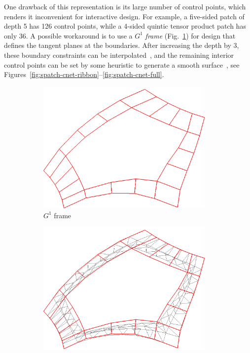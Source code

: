 \documentclass[9pt,academicons]{article}
\begin{document}
One drawback of this representation is its large number of control points, which renders it
inconvenient for interactive design. For example, a five-sided patch of depth 5 has 126 control
points, while a 4-sided quintic tensor product patch has only 36. A possible workaround is to use a
$G^1$ \emph{frame} (Fig.~\ref{fig:spatch-ribbon})
for design that defines the tangent planes at the boundaries.
After increasing the depth by 3, these boundary constraints can be interpolated~\cite{Loop:1990},
and the remaining interior control points can be set by some heuristic to generate a smooth
surface~\cite{Salvi:2019:KEPAF}, see
Figures~\ref{fig:spatch-cnet-ribbon}--\ref{fig:spatch-cnet-full}.
\begin{figure}
  {
    \begin{subfigure}{0.32\textwidth}
      \centering
      \includegraphics[width = 0.95\textwidth]{images/5-5-bezier-ribbon.png}
      \caption{$G^1$ frame}
      \label{fig:spatch-ribbon}
    \end{subfigure}
    \hfill
    \begin{subfigure}{0.32\textwidth}
      \centering
      \includegraphics[width = 0.95\textwidth]{images/5-5-cnet-ribbon.png}

\end{subfigure}}
\end{figure}
\end{document}

